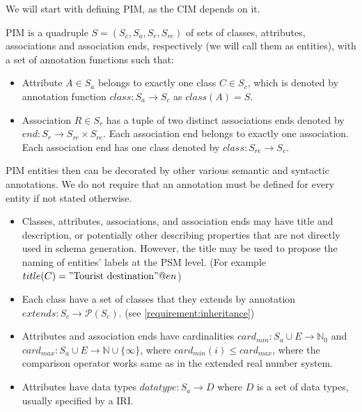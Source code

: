 \bigskip

We will start with defining PIM, as the CIM depends on it.

\begin{definition}[PIM] PIM is a quadruple $S=(S_c, S_a, S_r, S_{re})$ of sets of classes, attributes, associations and association ends, respectively (we will call them as entities), with a set of annotation functions such that:
    \begin{itemize}
        \item Attribute $A \in S_a$ belongs to exactly one class $C \in S_c$, which is denoted by annotation function ${class}: S_a \rightarrow S_c$ as ${class}(A)=S$.
        \item Association $R \in S_r$ has a tuple of two distinct associations ends denoted by ${end}: S_r \rightarrow S_{re}\times S_{re}$. Each association end belongs to exactly one association. Each association end has one class denoted by ${class}: S_{re} \rightarrow S_c$.
    \end{itemize}

    PIM entities then can be decorated by other various semantic and syntactic annotations. We do not require that an annotation must be defined for every entity if not stated otherwise.

    \begin{itemize}
        \item Classes, attributes, associations, and association ends may have title and description, or potentially other describing properties that are not directly used in schema generation. However, the title may be used to propose the naming of entities' labels at the PSM level. (For example $title(C)="\textrm{Tourist destination}"@en$)
        \item Each class have a set of classes that they extends by annotation $extends: S_c \rightarrow \mathcal{P}(S_c)$. (see \autoref{requirement:inheritance})
        \item Attributes and association ends have cardinalities $card_{min}: S_a \cup E \rightarrow \mathds{N}_0$ and $card_{max}: S_a \cup E \rightarrow \mathds{N} \cup \{\infty\}$, where $card_{min}(i) \leq card_{max}$, where the comparison operator works same as in the extended real number system.
        \item Attributes have data types $datatype: S_a \rightarrow D$ where $D$ is a set of data types, usually specified by a IRI.
    \end{itemize}
\end{definition}

